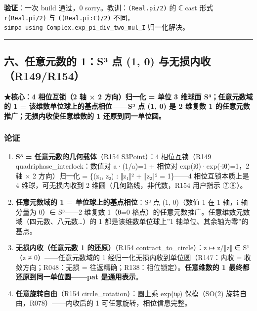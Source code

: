 \documentclass[
]{article}
\providecommand{\tightlist}{%
 \setlength{\itemsep}{0pt}\setlength{\parskip}{0pt}}
\begin{document}
\textbf{验证}：一次 build 通过，0 sorry。教训：\texttt{(Real.pi/2)} 的 ℂ
cast 形式 \texttt{↑(Real.pi/2)} 与 \texttt{((Real.pi:ℂ)/2)}
不同，\texttt{simpa\ using\ Complex.exp\_pi\_div\_two\_mul\_I}
归一化解决。

\begin{center}\rule{0.5\linewidth}{0.5pt}\end{center}

\subsection{六、任意元数的 1：S³ 点 (1, 0)
与无损内收（R149/R154）}\label{ux516dux4efbux610fux5143ux6570ux7684-1suxb3-ux70b9-1-0-ux4e0eux65e0ux635fux5185ux6536r149r154}

\textbf{★核心：4 相位互锁（2 轴 × 2 方向）归一化 = 单位 3 维球面
S³；任意元数域的 1 = 该维数单位球上的基点相位------S³ 点 (1, 0) 是 2
维复数 1 的任意元数推广；无损内收使任意维数的 1 还原到同一单位圆。}

\subsubsection{论证}\label{ux8bbaux8bc1-2}

\begin{enumerate}
\def\labelenumi{\arabic{enumi}.}
\tightlist
\item
 \textbf{S³ = 任意元数的几何载体}（R154 S3Point）：4 相位互锁（R149
 quadriphase\_interlock：数值对 a·(1/a)=1 + 相位对
 exp(iθ)·exp(-iθ)=1，2 轴 × 2 方向）归一化 = \{(z₁, z₂) : ‖z₁‖² + ‖z₂‖²
 = 1\}------4 相位互锁本质上是 4 维球，可无损内收到 2
 维圆（几何路线，非代数，R154 用户指示 ⑦⑧）。
\item
 \textbf{任意元数域的 1 = 单位球上的基点相位}：S³ 点 (1, 0)（数值 1 在
 1 轴，i 轴分量为 0）∈ S³------2 维复数 1（θ=0
 格点）的任意元数推广。任意维数元数域（四元数、八元数\ldots）的 1
 都是该维数单位球上''1 轴单位、其余轴为零''的基点。
\item
 \textbf{无损内收（任意元数 1 的还原）}（R154 contract\_to\_circle）：z
 ↦ z/‖z‖ ∈ S¹（z ≠ 0）------任意元数域的 1
 经归一化无损内收到单位圆（R147：内收 = 收敛方向；R048：无损 =
 往返精确；R138：相位锁定）。\textbf{任意维数的 1
 最终都还原到同一单位圆------pat 是通用表示}。
\item
 \textbf{任意旋转自由}（R154 circle\_rotation）：圆上乘 exp(iφ)
 保模（SO(2) 旋转自由，R078）------内收后的 1
 可任意旋转，相位信息完整。
\end{enumerate}
\end{document}
